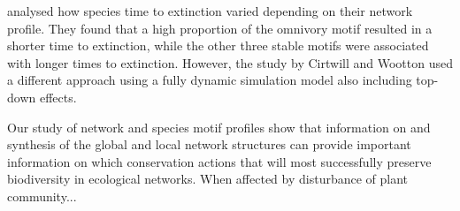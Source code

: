 \documentclass[12pt]{article}
\begin{document}
\begin{spacing}{2.0}
 \cite{Cirtwill2021_inprep} analysed how species time to extinction varied depending on their network profile. They found that a high proportion of the omnivory motif resulted in a shorter time to extinction, while the other three stable motifs were associated with longer times to extinction. However, the study by Cirtwill and Wootton used a different approach using a fully dynamic simulation model also including top-down effects. 
 
Our study of network and species motif profiles show that information on and synthesis of the global and local network structures can provide important information on which conservation actions that will most successfully preserve biodiversity in ecological networks. When affected by disturbance of plant community... 


    
    
    




\end{spacing}
\end{document}
